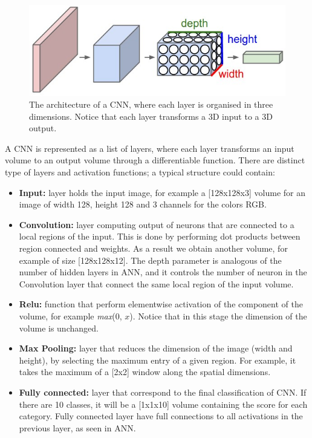 \documentclass{article} %
\begin{document}
\begin{figure}[htbp]
	\centering
	\includegraphics[scale=0.5]{cnn.png}
	\caption{The architecture of a CNN, where each layer is organised in three dimensions. Notice that each layer transforms a 3D input to a 3D output.}
	\label{CNN}
\end{figure}
\vspace{0.3cm}
A CNN is represented as a list of layers, where each layer transforms an input volume to an output volume through a differentiable function. There are distinct type of layers and activation functions; a typical structure could contain:
\begin{itemize}
	\item \textbf{Input:} layer holds the input image, for example a [128x128x3] volume for an image of width 128, height 128 and 3 channels for the colors RGB. 
	\item \textbf{Convolution:} layer computing output of neurons that are connected to a local regions of the input. This is done by performing dot products between region connected and weights. As a result we obtain another volume, for example of size [128x128x12]. The depth parameter is analogous of the number of hidden layers in ANN, and it controls the number of neuron in the Convolution layer that connect the same local region of the input volume. 
	\item \textbf{Relu:} function that perform elementwise activation of the component of the volume, for example \textit{max}(0, $x$). Notice that in this stage the dimension of the volume is unchanged. 
	\item \textbf{Max Pooling:} layer that reduces the dimension of the image (width and height), by selecting the maximum entry of a given region. For example, it takes the maximum of a [2x2] window along the spatial dimensions.
	\item \textbf{Fully connected:} layer that correspond to the final classification of CNN. If there are 10 classes, it will be a [1x1x10] volume containing the score for each category. Fully connected layer have full connections to all activations in the previous layer, as seen in ANN. 
\end{itemize}
\end{document}
